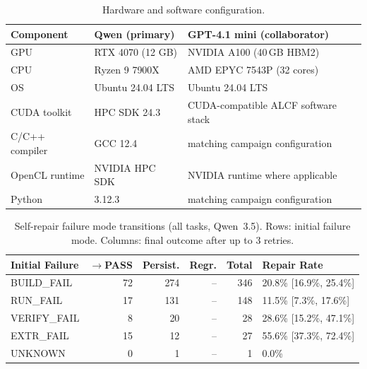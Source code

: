 \begin{table}[htbp]
\centering
\caption{Hardware and software configuration.}
\label{tab:hardware}
\small
\begin{tabular}{@{}lll@{}}
\toprule
Component & Qwen (primary) & GPT-4.1 mini (collaborator) \\
\midrule
GPU & RTX 4070 (12 GB) &  NVIDIA A100 (40\,GB HBM2) \\
CPU & Ryzen 9 7900X & AMD EPYC 7543P (32 cores) \\
OS & Ubuntu 24.04 LTS &  Ubuntu 24.04 LTS \\
CUDA toolkit & HPC SDK 24.3 & CUDA-compatible ALCF software stack \\
C/C++ compiler & GCC 12.4 & matching campaign configuration \\
OpenCL runtime & NVIDIA HPC SDK & NVIDIA runtime where applicable \\
Python & 3.12.3 & matching campaign configuration \\
\bottomrule
\end{tabular}
\end{table}



\begin{table}[htbp]
\centering
\caption{Self-repair failure mode transitions (all tasks, Qwen~3.5). Rows: initial failure mode. Columns: final outcome after up to 3 retries.}
\label{tab:repair-transitions}
\small
\begin{tabular}{@{}lrrrrl@{}}
\toprule
Initial Failure & $\to$PASS & Persist. & Regr. & Total & Repair Rate \\
\midrule
BUILD\_FAIL & 72 & 274 & -- & 346 & 20.8\% [16.9\%, 25.4\%] \\ %
RUN\_FAIL & 17 & 131 & -- & 148 & 11.5\% [7.3\%, 17.6\%] \\ %
VERIFY\_FAIL & 8 & 20 & -- & 28 & 28.6\% [15.2\%, 47.1\%] \\ %
EXTR\_FAIL & 15 & 12 & -- & 27 & 55.6\% [37.3\%, 72.4\%] \\ %
UNKNOWN & 0 & 1 & -- & 1 & 0.0\% \\ %
\bottomrule
\end{tabular}
\end{table}


